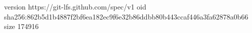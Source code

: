 version https://git-lfs.github.com/spec/v1
oid sha256:862b5d1b4887f2bf6ea182ec9f6e32b86ddbb80b443ccaf446a3fa62878a0b66
size 174916
